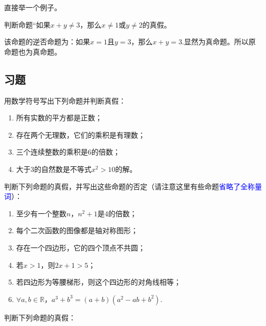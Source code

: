 \documentclass[lang=cn,math=cm,chinesefont=nofont,11pt,scheme=chinese,onecol]{elegantbook}
\begin{document}
直接举一个例子。

\begin{example}
  判断命题“如果$x+y\neq 3$，那么$x\neq 1$或$y\neq 2$的真假。
\end{example}

\begin{solution}
  该命题的逆否命题为：如果$x=1$且$y=3$，那么$x+y=3$.显然为真命题。所以原命题也为真命题。
\end{solution}

\subsection{习题}

\begin{exercise}
  用数学符号写出下列命题并判断真假：
\end{exercise}

\begin{enumerate}
  \item 所有实数的平方都是正数；
  \item 存在两个无理数，它们的乘积是有理数；
  \item 三个连续整数的乘积是6的倍数；
  \item 大于3的自然数是不等式$x^2>10$的解。
\end{enumerate}

\begin{exercise}
  判断下列命题的真假，并写出这些命题的否定（请注意这里有些命题\textcolor{blue}{省略了全称量词}）：
\end{exercise}

\begin{enumerate}
  \item 至少有一个整数$n$，$n^2+1$是4的倍数；
  \item 每个二次函数的图像都是轴对称图形；
  \item 存在一个四边形，它的四个顶点不共圆；
  \item 若$x>1$，则$2x+1>5$；
  \item 若四边形为等腰梯形，则这个四边形的对角线相等；
   \item $\forall a,b{\in}\mathbb{R}$，$a^3+b^3=(a+b)(a^2-ab+b^2)$.
\end{enumerate}

\begin{exercise}
  判断下列命题的真假：
\end{exercise}
\end{document}
